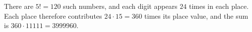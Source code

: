 There are $5!=120$ such numbers, and each digit appears $24$ times in each place. Each place therefore contributes $24\cdot15=360$ times its place value, and the sum is $360\cdot11111=\boxed{3999960}$.
